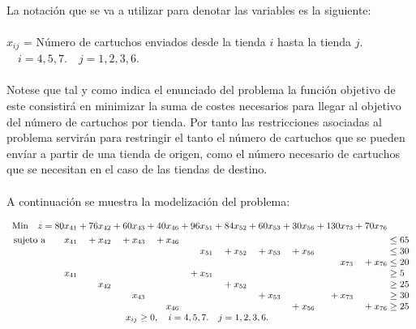 \documentclass[10pt, a4paper]{article}
\begin{document}
			\paragraph{}
			La notación que se va a utilizar para denotar las variables es la siguiente:
			\paragraph{}
			\(x_{ij}\) = Número de cartuchos enviados desde la tienda \(i\) hasta la tienda \(j\). \(\quad i=4,5,7. \quad j=1,2,3,6.\)

			\paragraph{}
			Notese que tal y como indica el enunciado del problema la función objetivo de este consistirá en minimizar la suma de costes necesarios para llegar al objetivo del número de cartuchos por tienda. Por tanto las restricciones asociadas al problema servirán para restringir el tanto el número de cartuchos que se pueden envíar a partir de una tienda de origen, como el número necesario de cartuchos que se necesitan en el caso de las tiendas de destino.

			\paragraph{}
			A continuación se muestra la modelización del problema:

			\[
			  \small
			  \begin{array}{r@{}r@{}r@{}r@{}r@{}r@{}r@{}r@{}r@{}r@{}l}
			    \text{Min} \quad z=	80x_{41} &{} + 76x_{42} &{} + 60x_{43} &{} + 40x_{46} &{} + 96x_{51} &{} + 84x_{52} &{} + 60x_{53} &{} + 30x_{56} &{} + 130x_{73} &{} + 70x_{76} &{} \\[\jot]
			    \text{sujeto a}\qquad 	x_{41} &{} +   x_{42} &{} +   x_{43} &{} +   x_{46} &{}   &{}   &{}   &{}   &{}   &{}   &{} \leq 65 \\
			                     	&{}  &{}  &{}  &{} x_{51} &{} + x_{52} &{} + x_{53} &{} + x_{56} &{}  &{}  &{} \leq 30 \\
								 	&{} &{}  &{}  &{}  &{} &{}  &{}  &{} x_{73} &{} + x_{76} &{} \leq 20 \\
								 	x_{41} &{} &{} &{} &{} + x_{51} &{} &{}  &{}  &{} &{}  &{} \geq 5 \\
								 	&{}  x_{42} &{}  &{} &{}  &{} + x_{52} &{}  &{}  &{} &{}  &{} \geq 25 \\
								 	 &{}  &{}  x_{43} &{}  &{}  &{}  &{} + x_{53} &{}  &{} + x_{73} &{}  &{} \geq 30 \\
								 	&{}  &{}  &{} x_{46} &{}  &{}  &{}  &{} + x_{56} &{}  &{} + x_{76} &{} \geq 25 \\
			     \multicolumn{10}{c}{x_{ij} \geq 0, \quad i=4,5,7. \quad j=1,2,3,6.}
			  \end{array}
			\]
\end{document}
